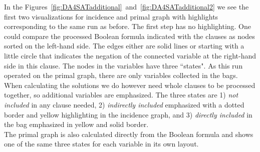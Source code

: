 \documentclass[a4paper, 12pt, bibliography=totoc]{scrartcl}
\begin{document}
\medskip\noindent
In the Figures~\ref{fig:DA4SATadditional}~and~\ref{fig:DA4SATadditional2} we see the first two visualizations for incidence and primal graph with highlights corresponding to the same run as before. The first step has no highlighting. One could compare the processed Boolean formula indicated with the clauses as nodes sorted on the left-hand side. The edges either are solid lines or starting with a little circle that indicates the negation of the connected variable at the right-hand side in this clause. The nodes in the variables have three ``states". As this run operated on the primal graph, there are only variables collected in the bags. When calculating the solutions we do however need whole clauses to be processed together, so additional variables are emphasized. The three states are 1)\textit{ not included} in any clause needed, 2)\textit{ indirectly included} emphasized with a dotted border and yellow highlighting in the incidence graph, and 3) \textit{ directly included} in the bag emphasized in yellow and solid border. \\
The primal graph is also calculated directly from the Boolean formula and shows one of the same three states for each variable in its own layout.
\end{document}
